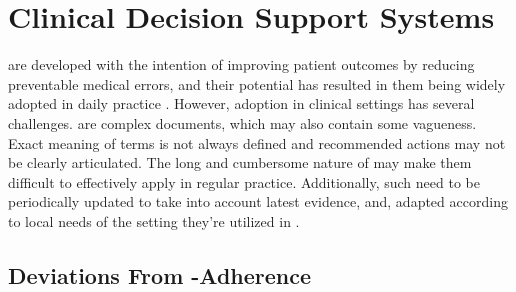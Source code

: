 
\section{Clinical Decision Support Systems}\label{sec:cdss-background}


\BPGs{} are developed with the intention of improving patient outcomes
by reducing preventable medical errors, and their potential
has resulted in them being widely adopted
in daily practice \cite{WoolfBMJ99}. However, \BPG{} adoption in
clinical settings has several challenges. \BPGs{} are complex documents,
which may also contain some vagueness.
Exact meaning of terms is not always defined and recommended
actions may not be clearly articulated. The long and cumbersome
nature of \BPGs{} may make them difficult to effectively apply
in regular practice. Additionally, such \BPGs{} need to be
periodically updated to take into account latest evidence, and,
adapted according to local needs of the setting they're utilized
in \cite{DeClerqSHTI08}.

\subsection{Deviations From \BPG{}-Adherence}

